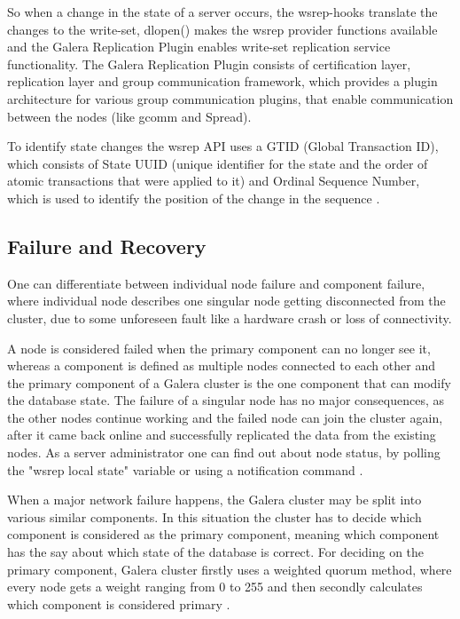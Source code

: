 \documentclass{sig-alternate}
\begin{document}
So when a change in the state of a server occurs, the wsrep-hooks translate the changes to the write-set, dlopen() makes the wsrep provider functions available and the Galera Replication Plugin enables write-set replication service functionality. The Galera Replication Plugin consists of certification layer, replication layer and group communication framework, which provides a plugin architecture for various group communication plugins, that enable communication between the nodes (like gcomm and Spread).

To identify state changes the wsrep API uses a GTID (Global Transaction ID), which consists of State UUID (unique identifier for the state and the order of atomic transactions that were applied to it) and Ordinal Sequence Number, which is used to identify the position of the change in the sequence \cite{wsrepapi}.

\subsection{Failure and Recovery}

One can differentiate between individual node failure and component failure, where individual node describes one singular node getting disconnected from the cluster, due to some unforeseen fault like a hardware crash or loss of connectivity.

A node is considered failed when the primary component can no longer see it, whereas a component is defined as multiple nodes connected to each other and the primary component of a Galera cluster is the one component that can modify the database state. The failure of a singular node has no major consequences, as the other nodes continue working and the failed node can join the cluster again, after it came back online and successfully replicated the data from the existing nodes. As a server administrator one can find out about node status, by polling the "wsrep local state" variable or using a notification command \cite{galerarecovery}.

When a major network failure happens, the Galera cluster may be split into various similar components. In this situation the cluster has to decide which component is considered as the primary component, meaning which component has the say about which state of the database is correct.  For deciding on the primary component, Galera cluster firstly uses a weighted quorum method, where every node gets a weight ranging from 0 to 255 and then secondly calculates which component is considered primary \cite{galeraquorum}.
\end{document}
